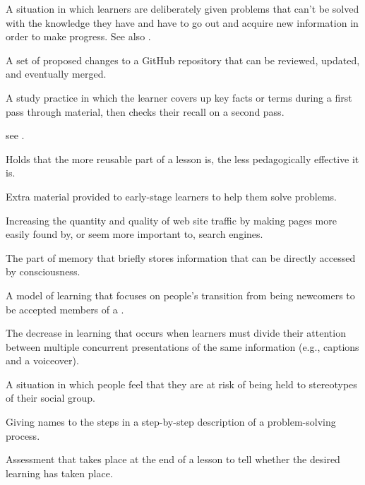 \begin{description}
 A situation in which learners
are deliberately given problems that can't be solved with the knowledge they
have and have to go out and acquire new information in order to make progress.
See also .

 A set of proposed changes to a GitHub
repository that can be reviewed, updated, and eventually merged.

 A study practice in which
the learner covers up key facts or terms during a first pass through material,
then checks their recall on a second pass.

 see .

 Holds that the more reusable
part of a lesson is, the less pedagogically effective it is.

 Extra material provided to early-stage
learners to help them solve problems.

 Increasing the quantity and quality
of web site traffic by making pages more easily found by, or seem more important
to, search engines.

 The part of memory that briefly
stores information that can be directly accessed by consciousness.

 A model of learning that focuses
on people's transition from being newcomers to be accepted members of a
.

 The decrease in
learning that occurs when learners must divide their attention between multiple
concurrent presentations of the same information (e.g., captions and a
voiceover).

 A situation in which people feel
that they are at risk of being held to stereotypes of their social group.

 Giving names to the steps in a
step-by-step description of a problem-solving process.

 Assessment that takes
place at the end of a lesson to tell whether the desired learning has taken
place.


\end{description}
